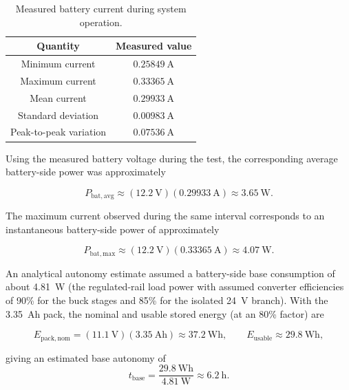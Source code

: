 \begin{table}[h]
    \centering
    \caption{Measured battery current during system operation.}
    \label{tab:battery_current_results}
    \renewcommand{\arraystretch}{1.15}
    \begin{tabular}{|c|c|}
        \hline
        \textbf{Quantity} & \textbf{Measured value} \\
        \hline
        Minimum current & \(0.25849~\mathrm{A}\) \\
        \hline
        Maximum current & \(0.33365~\mathrm{A}\) \\
        \hline
        Mean current & \(0.29933~\mathrm{A}\) \\
        \hline
        Standard deviation & \(0.00983~\mathrm{A}\) \\
        \hline
        Peak-to-peak variation & \(0.07536~\mathrm{A}\) \\
        \hline
    \end{tabular}
\end{table}

Using the measured battery voltage during the test, the corresponding average battery-side power was approximately

\begin{equation}
    P_{\mathrm{bat,avg}}
    \approx
    (12.2~\mathrm{V})(0.29933~\mathrm{A})
    \approx
    3.65~\mathrm{W}.
\end{equation}

The maximum current observed during the same interval corresponds to an instantaneous battery-side power of approximately

\begin{equation}
    P_{\mathrm{bat,max}}
    \approx
    (12.2~\mathrm{V})(0.33365~\mathrm{A})
    \approx
    4.07~\mathrm{W}.
\end{equation}

An analytical autonomy estimate assumed a battery-side base consumption of about 4.81~W (the regulated-rail load power with assumed converter efficiencies of 90\% for the buck stages and 85\% for the isolated 24~V branch). With the 3.35~Ah pack, the nominal and usable stored energy (at an 80\% factor) are

\begin{equation}
E_{\mathrm{pack,nom}} = (11.1~\mathrm{V})(3.35~\mathrm{Ah}) \approx 37.2~\mathrm{Wh}, \qquad E_{\mathrm{usable}} \approx 29.8~\mathrm{Wh},
\end{equation}

giving an estimated base autonomy of
\begin{equation}
t_{\mathrm{base}} = \frac{29.8~\mathrm{Wh}}{4.81~\mathrm{W}} \approx 6.2~\mathrm{h}.
\end{equation}

